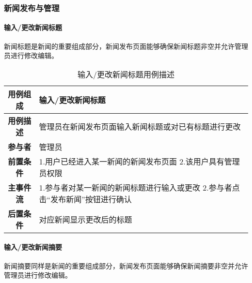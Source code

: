\subsubsection{新闻发布与管理}

\paragraph{输入/更改新闻标题}

新闻标题是新闻的重要组成部分，新闻发布页面能够确保新闻标题非空并允许管理员进行修改编辑。\\

\begin{table}[H]
	\centering
	\caption{输入/更改新闻标题用例描述}
	\renewcommand\arraystretch{1.5}
	\begin{tabular}{|c|>{\raggedright\arraybackslash}p{10cm}|}
		\hline
		\textbf{用例组成} & \textbf{输入/更改新闻标题}\\
		\hline
		\textbf{用例描述} & 管理员在新闻发布页面输入新闻标题或对已有标题进行更改\\ 
		\hline
		\textbf{参与者} & 管理员\\
		\hline
		\textbf{前置条件} & 
		1.用户已经进入某一新闻的新闻发布页面\newline
		2.该用户具有管理员权限\\
		\hline
		\textbf{主事件流} & 
		1.参与者对某一新闻的新闻标题进行输入或更改\newline
		2.参与者点击“发布新闻”按钮进行确认\\
		\hline
		\textbf{后置条件} & 对应新闻显示更改后的标题\\
		\hline
	\end{tabular}
\end{table}

\paragraph{输入/更改新闻摘要}

新闻摘要同样是新闻的重要组成部分，新闻发布页面能够确保新闻摘要非空并允许管理员进行修改编辑。\\

